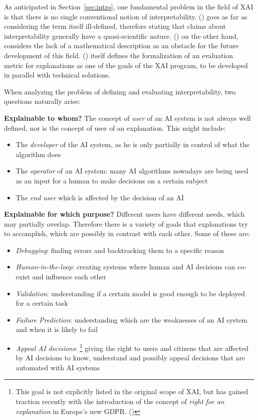 \documentclass[conference]{IEEEtran}
\begin{document}
As anticipated in Section~\ref{sec:intro}, one fundamental problem in the field
of XAI is that there is no single conventional notion of interpretability.
(\cite{mythos}) goes as far as considering the term itself ill-defined, therefore
stating that claims about interpretability generally have a quasi-scientific
nature. (\cite{Giannotti}) on the other hand, considers the lack of a
mathematical description as an obstacle for the future development of this
field. (\cite{DARPA}) itself defines the formalization of an evaluation metric
for explanations as one of the goals of the XAI program, to be developed in
parallel with technical solutions.

When analyzing the problem of defining and evaluating interpretability, two
questions naturally arise:

\textbf{Explainable to whom?} The concept of \textit{user} of an AI system is
not always well defined, nor is the concept of user of an explanation. This
might include:

\begin{itemize}
    \item The \textit{developer} of the AI system, as he is only partially in
          control of what the algorithm does
    \item The \textit{operator} of an AI system: many AI algorithms nowadays are
          being used as an input for a human to make decisions on a certain
          subject
    \item The \textit{end user} which is affected by the decision of an AI
\end{itemize}

\textbf{Explainable for which purpose?} Different users have different needs,
which may partially overlap. Therefore there is a variety of goals that
explanations try to accomplish, which are possibly in contrast with each other. Some of these are:
\begin{itemize}
    \item \textit{Debugging}: finding errors and backtracking them to a specific
          reason
    \item \textit{Human-in-the-loop}: creating systems where human and AI
          decisions can co-exist and influence each other
    \item \textit{Validation}: understanding if a certain model is good enough
          to be deployed for a certain task
    \item \textit{Failure Prediction}: understanding which are the weaknesses of
          an AI system and when it is likely to fail
    \item \textit{Appeal AI decisions}: \footnote{This goal is not explicitly
              listed in the original scope of XAI, but has gained traction
              recently with the introduction of the concept of \textit{right for
                  an explanation} in Europe's new GDPR. (\cite{righttoexpl})}
          giving the right to users and citizens that are affected by AI
          decisions to know, understand and possibly appeal decisions that
          are automated with AI systems
\end{itemize}
\end{document}

